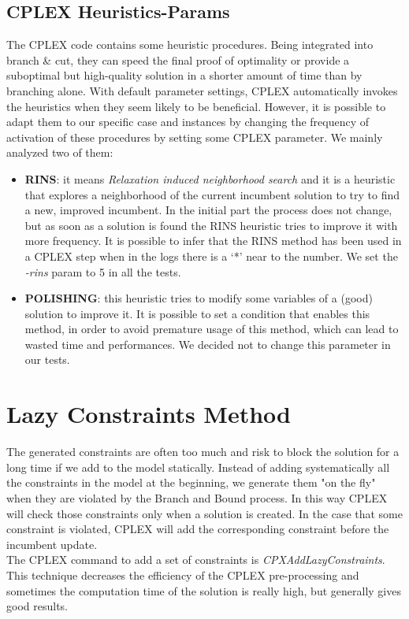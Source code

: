 \subsection{CPLEX Heuristics-Params}
The \textsc{CPLEX} code contains some heuristic procedures. Being integrated into branch \& cut, they can speed the final proof of optimality or provide a suboptimal but high-quality solution in a shorter amount of time than by branching alone. With default parameter settings, \textsc{CPLEX} automatically invokes the heuristics when they seem likely to be beneficial. However, it is possible to adapt them to our specific case and instances by changing the frequency of activation of these procedures by setting some \textsc{CPLEX} parameter. We mainly analyzed two of them:
\begin{itemize}
\setlength{\parskip}{0pt}
\setlength{\itemsep}{0pt plus 1pt}
\item \textbf{RINS}: it means \textit{Relaxation induced neighborhood search} and it is a heuristic that explores a neighborhood of the current incumbent solution to try to find a new, improved incumbent. In the initial part the process does not change, but as soon as a solution is found the RINS heuristic tries to improve it with more frequency. It is possible to infer that the RINS method has been used in a \textsc{CPLEX} step when in the logs there is a ‘*’ near to the number. We set the \textit{-rins} param to 5 in all the tests. 
\item \textbf{POLISHING}: this heuristic tries to modify some variables of a (good) solution to improve it. It is possible to set a condition that enables this method, in order to avoid premature usage of this method, which can lead to wasted time and performances. We decided not to change this parameter in our tests.
\end{itemize}

\section{Lazy Constraints Method}
The generated constraints are often too much and risk to block the solution for a long time if we add to the model statically.  
Instead of adding systematically all the constraints in the model at the beginning, we generate them "on the fly" when they are violated by the Branch and Bound process. In this way \textsc{CPLEX} will check those constraints only when a solution is created. In the case that some constraint is violated, \textsc{CPLEX} will add the corresponding constraint before the incumbent update. \\
The \textsc{CPLEX} command to add a set of constraints is \textit{CPXAddLazyConstraints}. \\
This technique decreases the efficiency of the \textsc{CPLEX} pre-processing and sometimes the computation time of the solution is really high, but generally gives good results.

